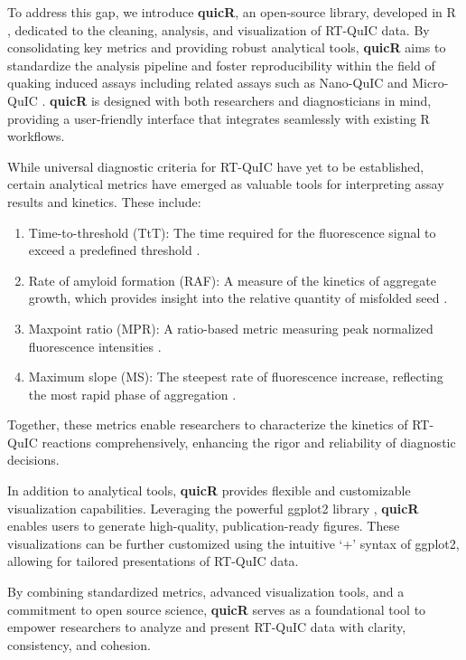 \documentclass[preprint,12pt,a4paper]{elsarticle}
\begin{document}
To address this gap, we introduce \textbf{quicR}, an open-source library, developed in R \cite{R2024}, dedicated to the cleaning, analysis, and visualization of RT-QuIC data. By consolidating key metrics and providing robust analytical tools, \textbf{quicR} aims to standardize the analysis pipeline and foster reproducibility within the field of quaking induced assays including related assays such as Nano-QuIC \cite{Christenson2023} and Micro-QuIC \cite{Lee2024}. \textbf{quicR} is designed with both researchers and diagnosticians in mind, providing a user-friendly interface that integrates seamlessly with existing R workflows.

While universal diagnostic criteria for RT-QuIC have yet to be established, certain analytical metrics have emerged as valuable tools for interpreting assay results and kinetics. These include:

\begin{enumerate}
\item Time-to-threshold (TtT): The time required for the fluorescence signal to exceed a predefined threshold \cite{Orru2015}.
\item Rate of amyloid formation (RAF): A measure of the kinetics of aggregate growth, which provides insight into the relative quantity of misfolded seed \cite{Gallups2022}.
\item Maxpoint ratio (MPR): A ratio-based metric measuring peak normalized fluorescence intensities \cite{Rowden2023}.
\item Maximum slope (MS): The steepest rate of fluorescence increase, reflecting the most rapid phase of aggregation \cite{Henderson2015}.
\end{enumerate}

Together, these metrics enable researchers to characterize the kinetics of RT-QuIC reactions comprehensively, enhancing the rigor and reliability of diagnostic decisions.

In addition to analytical tools, \textbf{quicR} provides flexible and customizable visualization capabilities. Leveraging the powerful ggplot2 library \cite{ggplot2016}, \textbf{quicR} enables users to generate high-quality, publication-ready figures. These visualizations can be further customized using the intuitive `+' syntax of ggplot2, allowing for tailored presentations of RT-QuIC data.

By combining standardized metrics, advanced visualization tools, and a commitment to open source science, \textbf{quicR} serves as a foundational tool to empower researchers to analyze and present RT-QuIC data with clarity, consistency, and cohesion.
\end{document}
